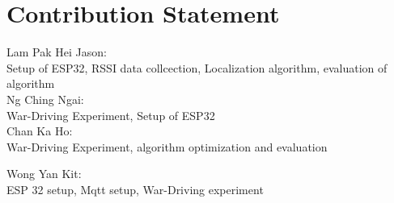 
\section{Contribution Statement}
Lam Pak Hei Jason:\\
Setup of ESP32, RSSI data collcection, Localization algorithm, evaluation of algorithm\\ 
Ng Ching Ngai:\\
War-Driving Experiment, Setup of ESP32\\

Chan Ka Ho: \\
War-Driving Experiment, algorithm optimization and evaluation 

Wong Yan Kit: \\
ESP 32 setup, Mqtt setup, War-Driving experiment
